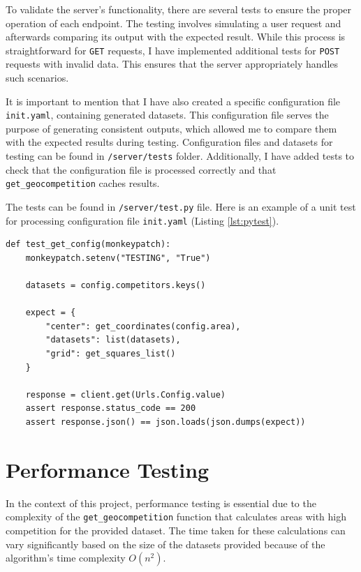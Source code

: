 To validate the server's functionality, there are several tests to ensure the proper operation of each endpoint. The testing involves simulating a user request and afterwards comparing its output with the expected result. While this process is straightforward for \texttt{GET} requests, I have implemented additional tests for \texttt{POST} requests with invalid data. This ensures that the server appropriately handles such scenarios.

It is important to mention that I have also created a specific configuration file \texttt{init.yaml}, containing generated datasets. This configuration file serves the purpose of generating consistent outputs, which allowed me to compare them with the expected results during testing. Configuration files and datasets for testing can be found in \texttt{/server/tests} folder. Additionally, I have added tests to check that the configuration file is processed correctly and that \texttt{get\_geocompetition} caches results.

The tests can be found in \texttt{/server/test.py} file. Here is an example of a unit test for processing configuration file \texttt{init.yaml} (Listing \ref{lst:pytest}). 

\begin{lstlisting}[caption={Unit test for retrieving configuration settings.}, label={lst:pytest}]
def test_get_config(monkeypatch):
    monkeypatch.setenv("TESTING", "True")
    
    datasets = config.competitors.keys()

    expect = {
        "center": get_coordinates(config.area),
        "datasets": list(datasets),
        "grid": get_squares_list()
    }

    response = client.get(Urls.Config.value)
    assert response.status_code == 200
    assert response.json() == json.loads(json.dumps(expect))
\end{lstlisting}

\section{Performance Testing}
\label{sec:performanceTesting}

In the context of this project, performance testing is essential due to the complexity of the \texttt{get\_geocompetition} function that calculates areas with high competition for the provided dataset. The time taken for these calculations can vary significantly based on the size of the datasets provided because of the algorithm's time complexity $O(n^2)$.

